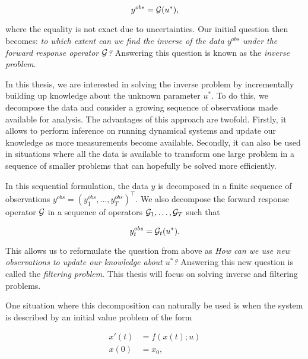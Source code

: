 \begin{equation}\label{inverse-formula}
  y^{obs} = \mathcal{G}(u^*),
\end{equation}

where the equality is not exact due to uncertainties. Our initial question then becomes: \textit{to which extent can we find the inverse of the data $y^{obs}$ under the forward response operator $\mathcal{G}$?} Answering this question is known as the \textit{inverse problem}.

In this thesis, we are interested in solving the inverse problem by incrementally building up knowledge about the unknown parameter $u^*$. To do this, we decompose the data and consider a growing sequence of observations made available for analysis. The advantages of this approach are twofold. Firstly, it allows to perform inference on running dynamical systems and update our knowledge as more measurements become available. Secondly, it can also be used in situations where all the data is available to transform one large problem in a sequence of smaller problems that can hopefully be solved more efficiently.

In this sequential formulation, the data $y$ is decomposed in a finite sequence of observations $y^{obs} = (y^{obs}_1, \ldots, y^{obs}_T)^\top$. We also decompose the forward response operator $\mathcal{G}$ in a sequence of operators $\mathcal{G}_1, \ldots, \mathcal{G}_T$ such that

\begin{equation*}
  y^{obs}_t = \mathcal{G}_t(u^*).
\end{equation*}


This allows us to reformulate the question from above as \textit{How can we use new observations to update our knowledge about $u^*$?} Answering this new question is called the \textit{filtering problem}. This thesis will focus on solving inverse and filtering problems.

One situation where this decomposition can naturally be used is when the system is described by an initial value problem of the form

\begin{equation}
  \begin{aligned}
    x'(t) &= f(x(t); u)\\
    x(0) &= x_0,
  \end{aligned}
\end{equation}  

